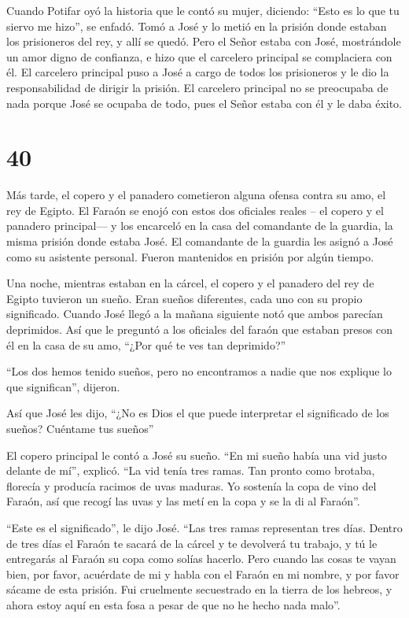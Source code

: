  Cuando Potifar oyó la historia que le contó su mujer,
diciendo: ``Esto es lo que tu siervo me hizo'', se enfadó. 
Tomó a José y lo metió en la prisión donde estaban los prisioneros del
rey, y allí se quedó.  Pero el Señor estaba con José,
mostrándole un amor digno de confianza, e hizo que el carcelero
principal se complaciera con él.  El carcelero principal
puso a José a cargo de todos los prisioneros y le dio la responsabilidad
de dirigir la prisión.  El carcelero principal no se
preocupaba de nada porque José se ocupaba de todo, pues el Señor estaba
con él y le daba éxito.

\hypertarget{section-39}{%
\section{40}\label{section-39}}

 Más tarde, el copero y el panadero cometieron alguna ofensa
contra su amo, el rey de Egipto.  El Faraón se enojó con
estos dos oficiales reales -- el copero y el panadero principal---
 y los encarceló en la casa del comandante de la guardia, la
misma prisión donde estaba José.  El comandante de la
guardia les asignó a José como su asistente personal. Fueron mantenidos
en prisión por algún tiempo.

 Una noche, mientras estaban en la cárcel, el copero y el
panadero del rey de Egipto tuvieron un sueño. Eran sueños diferentes,
cada uno con su propio significado.  Cuando José llegó a la
mañana siguiente notó que ambos parecían deprimidos.  Así
que le preguntó a los oficiales del faraón que estaban presos con él en
la casa de su amo, ``¿Por qué te ves tan deprimido?''

 ``Los dos hemos tenido sueños, pero no encontramos a nadie
que nos explique lo que significan'', dijeron.

Así que José les dijo, ``¿No es Dios el que puede interpretar el
significado de los sueños? Cuéntame tus sueños''

 El copero principal le contó a José su sueño. ``En mi sueño
había una vid justo delante de mí'', explicó.  ``La vid
tenía tres ramas. Tan pronto como brotaba, florecía y producía racimos
de uvas maduras.  Yo sostenía la copa de vino del Faraón,
así que recogí las uvas y las metí en la copa y se la di al Faraón''.

 ``Este es el significado'', le dijo José. ``Las tres ramas
representan tres días.  Dentro de tres días el Faraón te
sacará de la cárcel y te devolverá tu trabajo, y tú le entregarás al
Faraón su copa como solías hacerlo.  Pero cuando las cosas
te vayan bien, por favor, acuérdate de mi y habla con el Faraón en mi
nombre, y por favor sácame de esta prisión.  Fui cruelmente
secuestrado en la tierra de los hebreos, y ahora estoy aquí en esta fosa
a pesar de que no he hecho nada malo''.

